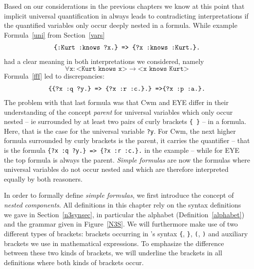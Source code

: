 Based on our considerations in the previous chapters we know at this point that implicit universal quantification in \nthree always leads to contradicting interpretations 
if the quantified variables only occur deeply nested in a formula.
While example 
Formula~\ref{uni} from Section~\ref{vars}
\begin{multline}\notag
 \texttt{\{:Kurt :knows ?x.\} => }%
 \texttt{\{?x :knows :Kurt.\}.}%
\end{multline}
had a clear meaning in both interpretations we considered, namely
\[
 \forall \texttt{x}: \texttt{<Kurt knows x>}\rightarrow \texttt{<x knows Kurt>}
\]
Formula~\ref{fff} led to discrepancies:
\begin{multline}\notag
\texttt{\{\{?x :q ?y.\} => \{?x :r :c.\}.\} =>}
\texttt{\{?x :p :a.\}.}
\end{multline}
The problem with that last formula was that Cwm and EYE differ in their understanding of the concept \emph{parent}  
for universal variables which only occur nested -- ie surrounded by at least two pairs of curly brackets \texttt{\{~\}} -- in a formula.  Here, that is the case 
for the universal variable
\texttt{?y}. For Cwm, the next higher formula surrounded by curly brackets is the parent, it carries the quantifier -- that is the formula \texttt{\{?x :q ?y.\} => \{?x :r :c.\}.} in the example --
while for EYE the top formula is always the parent. \emph{Simple formulas} are now the formulas where universal variables do not occur nested 
and which are therefore interpreted 
equally by both reasoners. 

In order to formally define \emph{simple formulas}, we first introduce the concept of \emph{nested components}.
All definitions in this chapter rely on the syntax definitions we gave in Section~\ref{n3synsec}, in particular the \nthree alphabet (Definition~\ref{alphabet}) 
and the grammar given in 
Figure~\ref{N3S}. 
We will furthermore make use of two different types of brackets: brackets occurring in \nthree's syntax \texttt{\{}, \texttt{\}}, \texttt{(}, \texttt{)} and auxiliary 
brackets we use in mathematical expressions.
 To emphasize the difference between these two kinds of brackets,
 we will underline the \nthree brackets in all definitions where both kinds of brackets occur.

